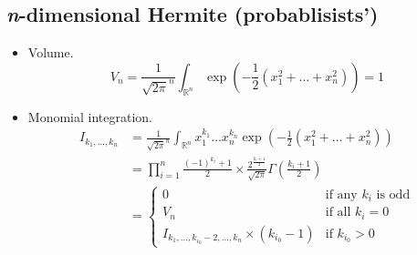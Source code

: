 \documentclass[draft]{scrartcl}
\begin{document}
\subsection*{\textit{n}-dimensional Hermite (probablisists')}
\begin{itemize}
  \item Volume.
\[
  V_n = \frac{1}{\sqrt{2\pi}^n} \int_{\mathbb{R}^n}
  \exp\left(-\frac{1}{2}(x_1^2+\dots+x_n^2)\right) = 1
\]


  \item Monomial integration.
  \[
    \begin{split}
    I_{k_1,\dots,k_n}
      &= \frac{1}{\sqrt{2\pi}^n} \int_{\mathbb{R}^n} x_1^{k_1}\dots x_n^{k_n}
      \exp\left(-\frac{1}{2}(x_1^2+\dots+x_n^2)\right)\\
    &= \prod_{i=1}^n \frac{(-1)^{k_i} + 1}{2} \times
      \frac{2^{\frac{k_i+1}{2}}}{\sqrt{2\pi}} \Gamma\left(\frac{k_i+1}{2}\right)\\
    &=\begin{cases}
      0&\text{if any $k_i$ is odd}\\
      V_n&\text{if all $k_i=0$}\\
      I_{k_1,\dots,k_{i_0}-2,\dots,k_n} \times (k_{i_0} - 1)&\text{if $k_{i_0} > 0$}
    \end{cases}
    \end{split}
  \]
\end{itemize}


{}

\end{document}
